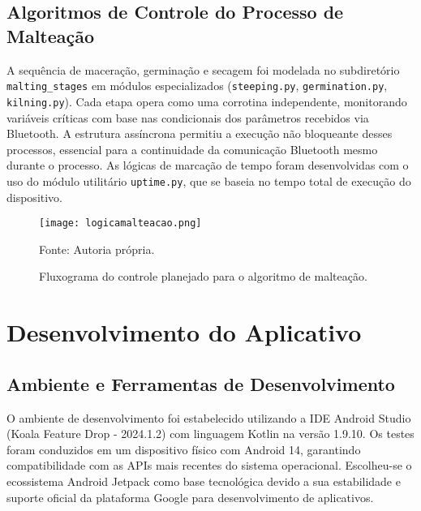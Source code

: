 \subsection{Algoritmos de Controle do Processo de Malteação}
A sequência de maceração, germinação e secagem foi modelada no subdiretório \texttt{malting\_stages} em módulos especializados (\texttt{steeping.py}, \texttt{germination.py}, \texttt{kilning.py}). Cada etapa opera como uma corrotina independente, monitorando variáveis críticas com base nas condicionais dos parâmetros recebidos via Bluetooth. A estrutura assíncrona permitiu a execução não bloqueante desses processos, essencial para a continuidade da comunicação Bluetooth mesmo durante o processo. As lógicas de marcação de tempo foram desenvolvidas com o uso do módulo utilitário \texttt{uptime.py}, que se baseia no tempo total de execução do dispositivo.

\begin{figure}[ht]
    \centering
    \caption{Fluxograma do controle planejado para o algoritmo de malteação.}
    \label{fig:logicamalteacao}
    \texttt{[image: logicamalteacao.png]}

    {\centering\footnotesize Fonte: Autoria própria.\par}
\end{figure}





\section{Desenvolvimento do Aplicativo}
\subsection{Ambiente e Ferramentas de Desenvolvimento}

O ambiente de desenvolvimento foi estabelecido utilizando a IDE Android Studio (Koala Feature Drop - 2024.1.2) com linguagem Kotlin na versão 1.9.10. Os testes foram conduzidos em um dispositivo físico com Android 14, garantindo compatibilidade com as APIs mais recentes do sistema operacional. Escolheu-se o ecossistema Android Jetpack como base tecnológica devido a sua estabilidade e suporte oficial da plataforma Google para desenvolvimento de aplicativos.

